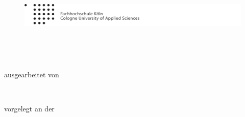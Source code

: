 \begin{titlepage}
\begin{center}

\begin{figure}[!ht]
\includegraphics[natwidth=920pt, natheight=95pt, width=1.0\textwidth]{Bilder/FHGummersbachLogo.pdf}
\end{figure}


\vspace{0.8cm}
\begin{rmfamily}
\textbf{\huge \mbtitle}\\
\end{rmfamily}

\vspace{1.2cm}
\begin{LARGE}
\textbf{\mbtype}\\
\end{LARGE}


\vspace{0.4cm}
\begin{large}
ausgearbeitet von\\ 
\vspace{0.2cm}
\begin{LARGE}
\textbf{\mbname}\\
\end{LARGE}
\end{large}

\vspace{1.2cm}
\begin{small}
vorgelegt an der\\ 
\vspace{0.4cm}
\mbuniversity
\end{small}


\end{center}
\end{titlepage}
